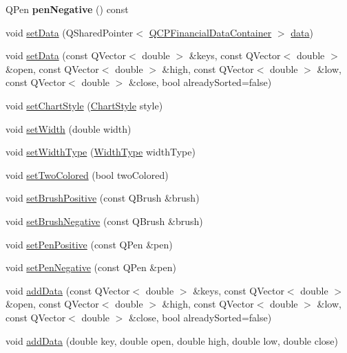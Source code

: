 \begin{DoxyCompactItemize}
Q\+Pen {\bfseries pen\+Negative} () const
\item 
void \hyperlink{classQCPFinancial_a72089e75b8a50d18097526c3c79fdb85}{set\+Data} (Q\+Shared\+Pointer$<$ \hyperlink{classQCPDataContainer}{Q\+C\+P\+Financial\+Data\+Container} $>$ \hyperlink{classQCPFinancial_aec3f666271cf48bd7b87d84fe3f8c074}{data})
\item 
void \hyperlink{classQCPFinancial_a12992e669ed19d7bb48dbe601570cc05}{set\+Data} (const Q\+Vector$<$ double $>$ \&keys, const Q\+Vector$<$ double $>$ \&open, const Q\+Vector$<$ double $>$ \&high, const Q\+Vector$<$ double $>$ \&low, const Q\+Vector$<$ double $>$ \&close, bool already\+Sorted=false)
\item 
void \hyperlink{classQCPFinancial_a5a59175d36279d71596e64d7bb65596f}{set\+Chart\+Style} (\hyperlink{classQCPFinancial_a0f800e21ee98d646dfc6f8f89d10ebfb}{Chart\+Style} style)
\item 
void \hyperlink{classQCPFinancial_a99633f8bac86a61d534ae5eeb1a3068f}{set\+Width} (double width)
\item 
void \hyperlink{classQCPFinancial_a204b7b710352796593a432b723e34089}{set\+Width\+Type} (\hyperlink{classQCPFinancial_aef1761dda71a53dc5269685e9e492626}{Width\+Type} width\+Type)
\item 
void \hyperlink{classQCPFinancial_a138e44aac160a17a9676652e240c5f08}{set\+Two\+Colored} (bool two\+Colored)
\item 
void \hyperlink{classQCPFinancial_a5ebff2b1764efd07cc44942e67821829}{set\+Brush\+Positive} (const Q\+Brush \&brush)
\item 
void \hyperlink{classQCPFinancial_a8bbdd87629f9144b3ef51af660c0961a}{set\+Brush\+Negative} (const Q\+Brush \&brush)
\item 
void \hyperlink{classQCPFinancial_ac58aa3adc7a35aab0088764b840683e5}{set\+Pen\+Positive} (const Q\+Pen \&pen)
\item 
void \hyperlink{classQCPFinancial_afe5c07e94ccea01a75b3a2476993c346}{set\+Pen\+Negative} (const Q\+Pen \&pen)
\item 
void \hyperlink{classQCPFinancial_a372ac031e44a7a6c912d203556af96f7}{add\+Data} (const Q\+Vector$<$ double $>$ \&keys, const Q\+Vector$<$ double $>$ \&open, const Q\+Vector$<$ double $>$ \&high, const Q\+Vector$<$ double $>$ \&low, const Q\+Vector$<$ double $>$ \&close, bool already\+Sorted=false)
\item 
void \hyperlink{classQCPFinancial_a688bbd052e00a02954ddb0068b378170}{add\+Data} (double key, double open, double high, double low, double close)

\end{DoxyCompactItemize}
